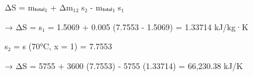 ΔS = mₜₒₜₐₗ₁ + Δm₁₂ s₂ - mₜₒₜₐₗ₁ s₁  

→ ΔS = s₁ = 1.5069 + 0.005 (7.7553 - 1.5069) = 1.33714 kJ/kg·K  

s₂ = s (70°C, x = 1) = 7.7553  

→ ΔS = 5755 + 3600 (7.7553) - 5755 (1.33714) = 66,230.38 kJ/K